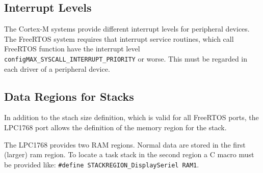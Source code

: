 \subsection{Interrupt Levels}
The Cortex-M systems provide different interrupt levels for peripheral devices.
The FreeRTOS system requires that interrupt service routines, which call
FreeRTOS function have the interrupt level 
\texttt{configMAX\_SYSCALL\_INTERRUPT\_PRIORITY} or worse. 
This must be regarded in each driver of a peripheral device.

\subsection{Data Regions for Stacks}
In addition to the stach size definition, which is valid for all FreeRTOS
ports, the LPC1768 port allows the definition of the memory
region for the stack.

The LPC1768 provides two RAM regions. Normal data are stored in the first
(larger) ram region. To locate a task stack in the second region
a C macro must be provided like:
\verb|#define STACKREGION_DisplaySeriel RAM1|.



